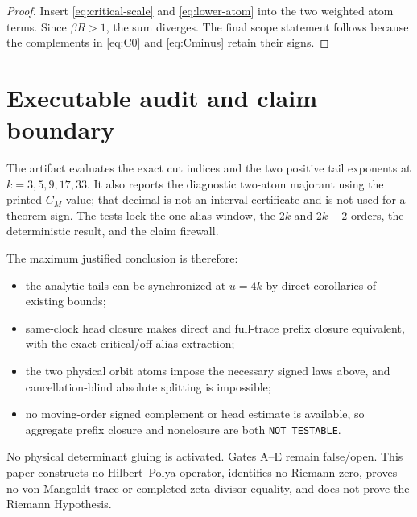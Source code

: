 \documentclass[11pt]{article}
\theoremstyle{remark}
\begin{document}
\begin{proof}
Insert \eqref{eq:critical-scale} and \eqref{eq:lower-atom} into the two
weighted atom terms.  Since $\beta R>1$, the sum diverges.  The final scope
statement follows because the complements in \eqref{eq:C0} and
\eqref{eq:Cminus} retain their signs.
\end{proof}

\section{Executable audit and claim boundary}

The artifact evaluates the exact cut indices and the two positive tail
exponents at $k=3,5,9,17,33$.  It also reports the diagnostic two-atom
majorant using the printed $C_M$ value; that decimal is not an interval
certificate and is not used for a theorem sign.  The tests lock the one-alias
window, the $2k$ and $2k-2$ orders, the deterministic result, and the claim
firewall.

The maximum justified conclusion is therefore:
\begin{itemize}
\item the analytic tails can be synchronized at $u=4k$ by direct corollaries
of existing bounds;
\item same-clock head closure makes direct and full-trace prefix closure
equivalent, with the exact critical/off-alias extraction;
\item the two physical orbit atoms impose the necessary signed laws above,
and cancellation-blind absolute splitting is impossible;
\item no moving-order signed complement or head estimate is available, so
aggregate prefix closure and nonclosure are both \texttt{NOT\_TESTABLE}.
\end{itemize}

No physical determinant gluing is activated.  Gates A--E remain false/open.
This paper constructs no Hilbert--Polya operator, identifies no Riemann zero,
proves no von Mangoldt trace or completed-zeta divisor equality, and does not
prove the Riemann Hypothesis.



\end{document}
